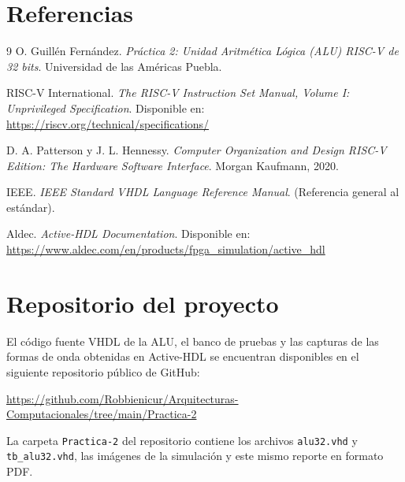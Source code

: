 \documentclass[12pt,letterpaper]{article}
\begin{document}
\section{Referencias}
\begin{thebibliography}{9}
O. Guillén Fernández. \textit{Práctica 2: Unidad Aritmética Lógica (ALU) RISC-V de 32 bits}. Universidad de las Américas Puebla.

RISC-V International. \textit{The RISC-V Instruction Set Manual, Volume I: Unprivileged Specification}. Disponible en: \url{https://riscv.org/technical/specifications/}

D. A. Patterson y J. L. Hennessy. \textit{Computer Organization and Design RISC-V Edition: The Hardware Software Interface}. Morgan Kaufmann, 2020.

IEEE. \textit{IEEE Standard VHDL Language Reference Manual}. (Referencia general al estándar).

Aldec. \textit{Active-HDL Documentation}. Disponible en: \url{https://www.aldec.com/en/products/fpga_simulation/active_hdl}
\end{thebibliography}

\section*{Repositorio del proyecto}

El código fuente VHDL de la ALU, el banco de pruebas y las capturas de las formas de onda obtenidas en Active-HDL se encuentran disponibles en el siguiente repositorio público de GitHub:
\begin{center}
\url{https://github.com/Robbienicur/Arquitecturas-Computacionales/tree/main/Practica-2}
\end{center}
La carpeta \texttt{Practica-2} del repositorio contiene los archivos \texttt{alu32.vhd} y \texttt{tb\_alu32.vhd}, las imágenes de la simulación y este mismo reporte en formato PDF.
\end{document}
